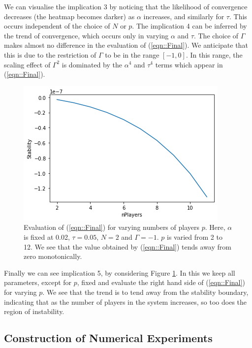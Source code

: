 \documentclass[sigconf]{aamas}
\begin{document}
We can visualise the implication 3 by noticing that the likelihood of convergence decreases (the heatmap becomes darker) as $\alpha$ increases, and similarly for $\tau$. This occurs independent of the choice of $N$ or $p$. The implication 4 can be inferred by the trend of convergence, which occurs only in varying $\alpha$ and $\tau$. The choice of $\Gamma$
makes almost no difference in the evaluation of (\ref{eqn::Final}). We anticipate that this is due to the restriction of $\Gamma$ to be in the range $[-1, 0]$. In this range, the scaling effect of $\Gamma^2$ is dominated by the $\alpha^4$ and $\tau^4$ terms which appear in (\ref{eqn::Final}).

\begin{figure}[t]
    \centering
    \includegraphics[width = 0.9 \linewidth]{Figures/p variation.png}
    \caption{Evaluation of (\ref{eqn::Final}) for varying numbers of players $p$. Here, $\alpha$ is fixed at 0.02, $\tau = 0.05$, $N = 2$ and $\Gamma = -1$. $p$ is varied from 2 to 12. We see that the value obtained by (\ref{eqn::Final}) tends away from zero monotonically.}
    \label{fig:pvariation}
\end{figure}

Finally we can see implication 5, by considering Figure \ref{fig:pvariation}. In this we keep all parameters, except for $p$, fixed and evaluate the right hand side of (\ref{eqn::Final}) for varying $p$. We see that the trend is to tend away from the stability boundary, indicating that as the number of players in the system increases, so too does the region of instability.

\subsection{Construction of Numerical Experiments}
\end{document}
